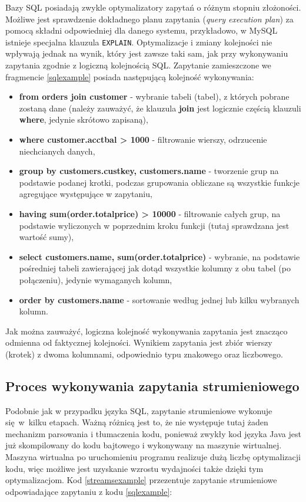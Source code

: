 \documentclass[12pt,twoside,openright]{extarticle}
\begin{document}
    Bazy SQL posiadają zwykle optymalizatory zapytań o różnym stopniu złożoności. Możliwe jest sprawdzenie dokładnego planu zapytania (\textit{query execution plan}) za pomocą składni odpowiedniej dla danego systemu, przykładowo, w MySQL istnieje specjalna klauzula \texttt{EXPLAIN}. Optymalizacje i zmiany kolejności nie wpływają jednak na wynik, który jest zawsze taki sam, jak przy wykonywaniu zapytania zgodnie z logiczną kolejnością SQL. Zapytanie zamieszczone we fragmencie \ref{sqlexample} posiada następującą kolejność wykonywania:

\begin{itemize}
    \item \textbf{from orders join customer} - wybranie tabeli (tabel), z których pobrane zostaną dane (należy zauważyć, że klauzula \textbf{join} jest logicznie częścią klauzuli \textbf{where}, jedynie skrótowo zapisaną),
    \item \textbf{where customer.acctbal > 1000} - filtrowanie wierszy, odrzucenie niechcianych danych,
    \item \textbf{group by customers.custkey, customers.name} - tworzenie grup na podstawie podanej krotki, podczas grupowania obliczane są wszystkie funkcje agregujące występujące w zapytaniu,
    \item \textbf{having sum(order.totalprice) > 10000} - filtrowanie całych grup, na podstawie wyliczonych w poprzednim kroku funkcji (tutaj sprawdzana jest wartość sumy),
    \item \textbf{select customers.name, sum(order.totalprice)} - wybranie, na podstawie pośredniej tabeli zawierającej jak dotąd wszystkie kolumny z obu tabel (po połączeniu), jedynie wymaganych kolumn,
    \item \textbf{order by customers.name} - sortowanie według jednej lub kilku wybranych kolumn.
\end{itemize}

    Jak można zauważyć, logiczna kolejność wykonywania zapytania jest znacząco odmienna od faktycznej kolejności. Wynikiem zapytania jest zbiór wierszy (krotek) z dwoma kolumnami, odpowiednio typu znakowego oraz liczbowego.

\subsection{Proces wykonywania zapytania strumieniowego}

    Podobnie jak w przypadku języka SQL, zapytanie strumieniowe wykonuje się w~kilku etapach. Ważną różnicą jest to, że nie występuje tutaj żaden mechanizm parsowania i tłumaczenia kodu, ponieważ zwykły kod języka Java jest już skompilowany do kodu bajtowego i wykonywany na maszynie wirtualnej. Maszyna wirtualna po uruchomieniu programu realizuje dużą liczbę optymalizacji kodu, więc możliwe jest uzyskanie wzrostu wydajności także dzięki tym optymalizacjom. Kod \ref{streamsexample} przezentuje zapytanie strumieniowe odpowiadające zapytaniu z kodu \ref{sqlexample}:
\end{document}
